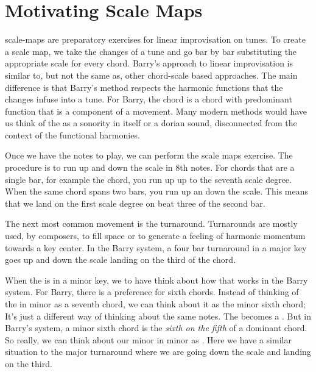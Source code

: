 \section{Motivating Scale Maps}
\Gls{scale-maps} are preparatory exercises for linear improvisation on tunes. To create a scale map, we take the changes of a tune and go bar by bar substituting the appropriate scale for every chord. Barry's approach to linear improvisation is similar to, but not the same as, other chord-scale based approaches. The main difference is that Barry's method respects the harmonic functions that the changes infuse into a tune. For Barry, the \twoChord{}  chord is a chord with predominant function that is a component of a \twoFive movement. Many modern methods would have us think of the \twoChord{} as a sonority in itself or a dorian sound, disconnected from the context of the functional harmonies.

Once we have the notes to play, we can perform the scale maps exercise. The procedure is to run up and down the scale in 8th notes. For chords that are a single bar, for example the \twoChord{} chord, you run up up to the seventh scale degree. When the same chord spans two bars, you run up an down the scale.  This means that we land on the first scale degree on beat three of the second bar.


The next most common movement is the turnaround. Turnarounds are mostly used, by composers, to fill space or to generate a feeling of harmonic momentum towards a key center. In the Barry system, a four bar turnaround in a major key goes up and down the scale landing on the third of the \sixChord{} chord.


When the \twoFive{} is in a minor key, we to have think about how that works in the Barry system. For Barry, there is a preference for sixth chords. Instead of thinking of the \twoChord{} in minor as a seventh chord, we can think about it as the minor sixth chord; It's just a different way of thinking about the same notes. The  becomes a . But in Barry's system, a minor sixth chord is the \emph{sixth on the fifth} of a dominant chord. So really, we can think about our minor \twoChord in  minor as . Here we have a similar situation to the major turnaround where we are going down the scale and landing on the third.

